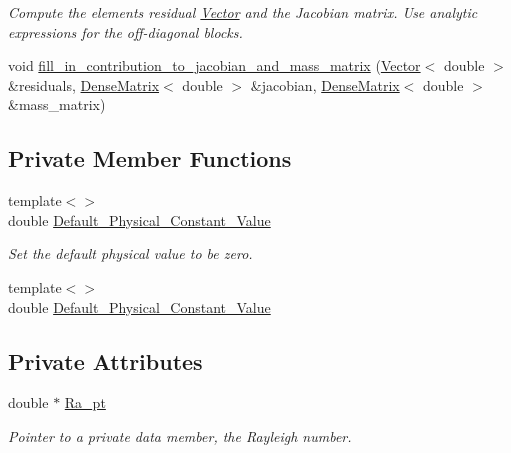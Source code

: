\begin{DoxyCompactItemize}
\begin{DoxyCompactList}\small\item\em Compute the element\textquotesingle{}s residual \hyperlink{classoomph_1_1Vector}{Vector} and the Jacobian matrix. Use analytic expressions for the off-\/diagonal blocks. \end{DoxyCompactList}\item 
void \hyperlink{classoomph_1_1BuoyantQCrouzeixRaviartElement_a7d22156d87949e4c64d597d60fe00225}{fill\+\_\+in\+\_\+contribution\+\_\+to\+\_\+jacobian\+\_\+and\+\_\+mass\+\_\+matrix} (\hyperlink{classoomph_1_1Vector}{Vector}$<$ double $>$ \&residuals, \hyperlink{classoomph_1_1DenseMatrix}{Dense\+Matrix}$<$ double $>$ \&jacobian, \hyperlink{classoomph_1_1DenseMatrix}{Dense\+Matrix}$<$ double $>$ \&mass\+\_\+matrix)
\end{DoxyCompactItemize}
\subsection*{Private Member Functions}
\begin{DoxyCompactItemize}
\item 
{\footnotesize template$<$$>$ }\\double \hyperlink{classoomph_1_1BuoyantQCrouzeixRaviartElement_a37e9dc4e6e5a8120a2f27587b5853086}{Default\+\_\+\+Physical\+\_\+\+Constant\+\_\+\+Value}
\begin{DoxyCompactList}\small\item\em Set the default physical value to be zero. \end{DoxyCompactList}\item 
{\footnotesize template$<$$>$ }\\double \hyperlink{classoomph_1_1BuoyantQCrouzeixRaviartElement_a74cccd0d2c7e943221f338fded0c18db}{Default\+\_\+\+Physical\+\_\+\+Constant\+\_\+\+Value}
\end{DoxyCompactItemize}
\subsection*{Private Attributes}
\begin{DoxyCompactItemize}
\item 
double $\ast$ \hyperlink{classoomph_1_1BuoyantQCrouzeixRaviartElement_a054ffb965ec8cce9b6b2da2336a1e7d8}{Ra\+\_\+pt}
\begin{DoxyCompactList}\small\item\em Pointer to a private data member, the Rayleigh number. \end{DoxyCompactList}\end{DoxyCompactItemize}
